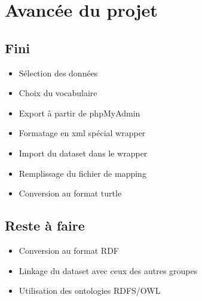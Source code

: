 \documentclass[12pt,a4paper]{article}
\begin{document}
	\section{Avancée du projet}
	\subsection{Fini}
		\begin{itemize}		
			\item{Sélection des données}
			\item{Choix du vocabulaire}
			\item{Export à partir de phpMyAdmin}
			\item{Formatage en xml spécial wrapper}
			\item{Import du dataset dans le wrapper}
            \item{Remplissage du fichier de mapping}
			\item{Conversion au format turtle}
		\end{itemize}
	\subsection{Reste à faire}
		\begin{itemize}
			\item{Conversion au format RDF}
			\item{Linkage du dataset avec ceux des autres groupes}
			\item{Utilisation des ontologies RDFS/OWL}
		\end{itemize}
\end{document}
